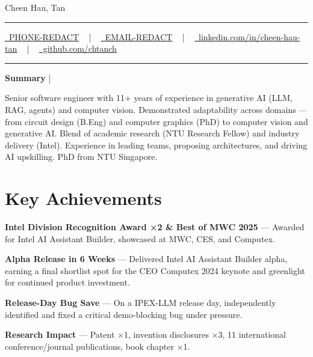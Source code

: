 \documentclass[a4paper,11pt]{article}
\newcommand{\documentTitle}[2]{
	\begin{center}
			{\Huge\color{accentTitle} #1}
			\vspace{10pt}
			{\color{accentLine} \hrule}
			\vspace{2pt}
			\footnotesize{#2}
			\vspace{2pt}
			{\color{accentLine} \hrule}
	\end{center}
}
\newcommand{\tinysection}[1]{
	\phantomsection
	\addcontentsline{toc}{section}{#1}
	{\large{\bfseries\color{accentText}#1} {\color{accentLine} |}}
}
\newenvironment{resume_list}{
	\vspace{-7pt}
	\begin{itemize}[itemsep=-2px, parsep=1pt, leftmargin=30pt]
	}{
	\end{itemize}
}
\begin{document}
	
	
	\hypersetup{
		linkcolor=black,
		urlcolor=black,
		citecolor=black
	}
	
	\documentTitle{Cheen Hau, Tan}{
		\href{tel:PHONE-REDACT}{
			\raisebox{-0.05\height} \faPhone\ PHONE-REDACT} ~ | ~
		\href{mailto:EMAIL-REDACT}{
			\raisebox{-0.15\height} \faEnvelope\ EMAIL-REDACT} ~ | ~
		\href{https://linkedin.com/in/cheen-hau-tan/}{
			\raisebox{-0.15\height} \faLinkedin\ linkedin.com/in/cheen-hau-tan} ~ | ~
		\href{https://github.com/chtanch}{
			\raisebox{-0.15\height} \faGithub\ github.com/chtanch}
	}
	
	
	\hypersetup{
		linkcolor=black,
		urlcolor=blue!60!black,
		citecolor=black
	}
	
	\tinysection{Summary}
	Senior software engineer with 11+ years of experience in generative AI (LLM, RAG, agents) and computer vision. Demonstrated adaptability across domains — from circuit design (B.Eng) and computer graphics (PhD) to computer vision and generative AI. Blend of academic research (NTU Research Fellow) and industry delivery (Intel). Experience in leading teams, proposing architectures, and driving AI upskilling. PhD from NTU Singapore.
	

	\section{Key Achievements}
		\begin{resume_list}
		\item \textbf{Intel Division Recognition Award ×2 \& Best of MWC 2025} — Awarded for Intel AI Assistant Builder, showcased at MWC, CES, and Computex.
		\item \textbf{Alpha Release in 6 Weeks} — Delivered Intel AI Assistant Builder alpha, earning a final shortlist spot for the CEO Computex 2024 keynote and greenlight for continued product investment.
		\item \textbf{Release-Day Bug Save} — On a IPEX-LLM release day, independently identified and fixed a critical demo-blocking bug under pressure.
		\item \textbf{Research Impact} — Patent ×1, invention disclosures ×3, 11 international conference/journal publications, book chapter ×1.
	\end{resume_list}
	
\end{document}
